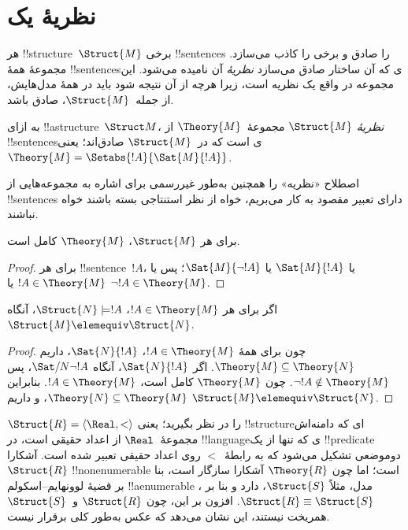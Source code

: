 \documentclass[../../../include/open-logic-section]{subfiles}
\begin{document}

\section{نظریهٔ یک }

هر !!{structure}~$\Struct{M}$ برخی !!{sentence}s را صادق و برخی را
کاذب می‌سازد. مجموعهٔ همهٔ !!{sentence}sی که آن ساختار صادق می‌سازد
\emph{نظریهٔ} آن نامیده می‌شود. این مجموعه در واقع یک نظریه است، زیرا
هرچه از آن نتیجه شود باید در همهٔ مدل‌هایش، از جمله~$\Struct{M}$، صادق
باشد.

\begin{defn}
  به ازای !!a{structure}~$\Struct M$، \emph{نظریهٔ} $\Struct{M}$
  مجموعهٔ~$\Theory{M}$ از !!{sentence}sی است که در~$\Struct{M}$ صادق‌اند؛
  یعنی $\Theory{M} = \Setabs{!A}{\Sat{M}{!A}}$.
\end{defn}

اصطلاح «نظریه» را همچنین به‌طور غیررسمی برای اشاره به مجموعه‌هایی از
!!{sentence}s دارای تعبیر مقصود به کار می‌بریم، خواه از نظر استنتاجی
بسته باشند خواه نباشند.

\begin{prop}
برای هر $\Struct{M}$، $\Theory{M}$ کامل است.
\end{prop}

\begin{proof}
برای هر !!{sentence}~$!A$، یا $\Sat{M}{!A}$ یا
$\Sat{M}{\lnot !A}$؛ پس یا $!A \in \Theory{M}$ یا
$\lnot !A \in \Theory{M}$.
\end{proof}

\begin{prop}
  اگر برای هر $!A \in \Theory{M}$، $\Struct{N} \models !A$، آنگاه
  $\Struct{M} \elemequiv \Struct{N}$.
\end{prop}

\begin{proof}
چون برای همهٔ $!A \in \Theory{M}$، $\Sat{N}{!A}$، داریم
$\Theory{M} \subseteq \Theory{N}$. اگر $\Sat{N}{!A}$، آنگاه
$\Sat/{N}{\lnot !A}$، پس $\lnot !A \notin \Theory{M}$. چون
$\Theory{M}$ کامل است، $!A \in \Theory{M}$. بنابراین
$\Theory{N} \subseteq \Theory{M}$، و داریم
$\Struct{M} \elemequiv \Struct{N}$.
\end{proof}

\begin{rem}
  $\Struct{R} = \langle\Real, <\rangle$ را در نظر بگیرید؛ یعنی
  !!{structure}ای که دامنه‌اش مجموعهٔ~$\Real$ از اعداد حقیقی است، در
  !!{language}ی که تنها از یک !!{predicate} دوموضعی تشکیل می‌شود که به
  رابطهٔ~$<$ روی اعداد حقیقی تعبیر شده است. آشکارا $\Struct{R}$
  !!{nonenumerable} است؛ اما چون $\Theory{R}$ آشکارا سازگار است، بنا بر
  قضیهٔ لوونهایم--اسکولم !!a{enumerable} مدل، مثلاً $\Struct{S}$، دارد
  و بنا بر ، $\Struct{R} \equiv \Struct{S}$. افزون
  بر این، چون $\Struct{R}$ و~$\Struct{S}$ همریخت نیستند، این نشان
  می‌دهد که عکس  به‌طور کلی برقرار نیست.
\end{rem}
\end{document}

